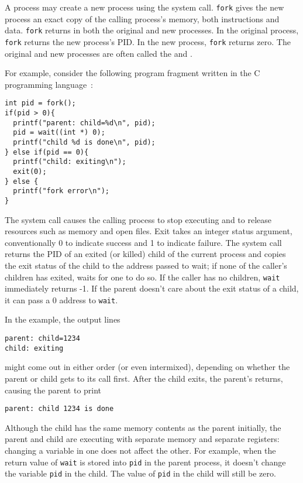 A process may create a new process using the
system call.
\lstinline{fork}
gives the new process an exact copy of the calling
process's memory,
both instructions and data.
\lstinline{fork}
returns in both the original and new processes.
In the original process, \lstinline{fork} returns the new process's
PID.
In the new process, \lstinline{fork} returns zero.
The original and new processes are often called the
and
.

For example, consider the following program fragment written in the C
programming language~\cite{kernighan}:
\begin{lstlisting}[]
int pid = fork();
if(pid > 0){
  printf("parent: child=%d\n", pid);
  pid = wait((int *) 0);
  printf("child %d is done\n", pid);
} else if(pid == 0){
  printf("child: exiting\n");
  exit(0);
} else {
  printf("fork error\n");
}
\end{lstlisting}
The
system call causes the calling process to stop executing and
to release resources such as memory and open files.
Exit takes an integer status argument,
conventionally 0 to indicate success and 1 to indicate failure.
The
system call returns the PID of an exited (or killed) child of the
current process and copies the exit status of the child to the address
passed to wait; if none of the caller's children
has exited,
waits for one to do so.
If the caller has no children, \lstinline{wait} immediately
returns -1.
If the parent doesn't care about the exit status of a child, it can
pass a 0 address to
\lstinline{wait}.

In the example, the output lines
\begin{lstlisting}[]
parent: child=1234
child: exiting
\end{lstlisting}
might come out in either order (or even intermixed), depending on whether the
parent or child gets to its
call first.
After the child exits, the parent's
returns, causing the parent to print
\begin{lstlisting}[]
parent: child 1234 is done
\end{lstlisting}
Although the child has the same memory contents as the parent initially, the
parent and child are executing with separate memory and separate registers:
changing a variable in one does not affect the other. For example, when the
return value of
\lstinline{wait}
is stored into
\lstinline{pid}
in the parent process,
it doesn't change the variable
\lstinline{pid}
in the child.  The value of
\lstinline{pid}
in the child will still be zero.

